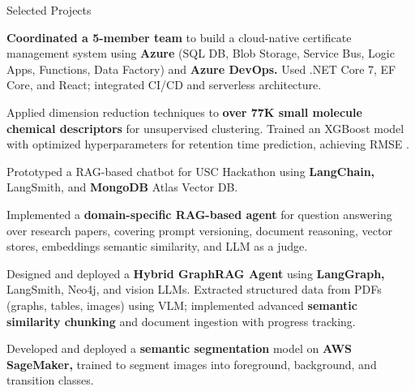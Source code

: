 \begin{cventries}
\cventry
    {}
    {Selected Projects}
    {}
    {}
    {
        \begin{cvitemsfree}
            \item{\textbf{Coordinated a 5-member team} to build a cloud-native certificate management system using \textbf{Azure} (SQL DB, Blob Storage, Service Bus, Logic Apps, Functions, Data Factory) and \textbf{Azure DevOps.} Used .NET Core 7, EF Core, and React; integrated CI/CD and serverless architecture.}
            \item{Applied dimension reduction techniques to \textbf{over 77K small molecule chemical descriptors} for unsupervised clustering. Trained an XGBoost model with optimized hyperparameters for retention time prediction, achieving RMSE \approx {}.}
            \item{Prototyped a RAG-based chatbot for USC Hackathon using \textbf{LangChain,} LangSmith, and \textbf{MongoDB} Atlas Vector DB.}
            \item{Implemented a \textbf{domain-specific RAG-based agent} for question answering over research papers, covering prompt versioning, document reasoning, vector stores, embeddings semantic similarity, and LLM as a judge.}
            \item{Designed and deployed a \textbf{Hybrid GraphRAG Agent} using \textbf{LangGraph,} LangSmith, Neo4j, and vision LLMs. Extracted structured data from PDFs (graphs, tables, images) using VLM; implemented advanced \textbf{semantic similarity chunking} and document ingestion with progress tracking.}
            \item{Developed and deployed a \textbf{semantic segmentation} model on \textbf{AWS SageMaker,} trained to segment images into foreground, background, and transition classes.}

\end{cvitemsfree}}
\end{cventries}
